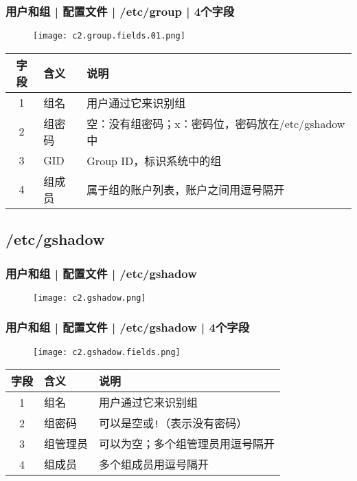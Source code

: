 \begin{frame}
  \frametitle{用户和组 | 配置文件 | /etc/group | \alert{4个字段}}
  \vspace{-0.3cm}
  \begin{figure}
    \centering
    \texttt{[image: c2.group.fields.01.png]}
  \end{figure}
  \pause
  \vspace{-0.5cm}
  \begin{table}
    \centering
    \begin{tabularx}{\textwidth}{clX}
      \hline
      \rowcolor{blue!50}字段 & 含义 & 说明\\
      \hline
      1 & 组名 & 用户通过它来识别组\\
      2 & 组密码 & 空：没有组密码；x：密码位，密码放在/etc/gshadow中\\
      3 & GID & Group ID，标识系统中的组\\
      4 & 组成员 & 属于组的账户列表，账户之间用逗号隔开\\
      \hline
    \end{tabularx}
  \end{table}
\end{frame}

\subsection{/etc/gshadow}
\begin{frame}
  \frametitle{用户和组 | 配置文件 | /etc/gshadow}
  \begin{figure}
    \centering
    \texttt{[image: c2.gshadow.png]}
  \end{figure}
\end{frame}

\begin{frame}
  \frametitle{用户和组 | 配置文件 | /etc/gshadow | 4个字段}
  \vspace{-0.3cm}
  \begin{figure}
    \centering
    \texttt{[image: c2.gshadow.fields.png]}
  \end{figure}
  \pause
  \vspace{-0.5cm}
  \begin{table}
    \centering
    \begin{tabularx}{\textwidth}{clX}
      \hline
      \rowcolor{blue!50}字段 & 含义 & 说明\\
      \hline
      1 & 组名 & 用户通过它来识别组\\
      2 & 组密码 & 可以是空或\verb|!|（表示没有密码）\\
      3 & 组管理员 & 可以为空；多个组管理员用逗号隔开\\
      4 & 组成员 & 多个组成员用逗号隔开\\
      \hline
    \end{tabularx}
  \end{table}
\end{frame}

